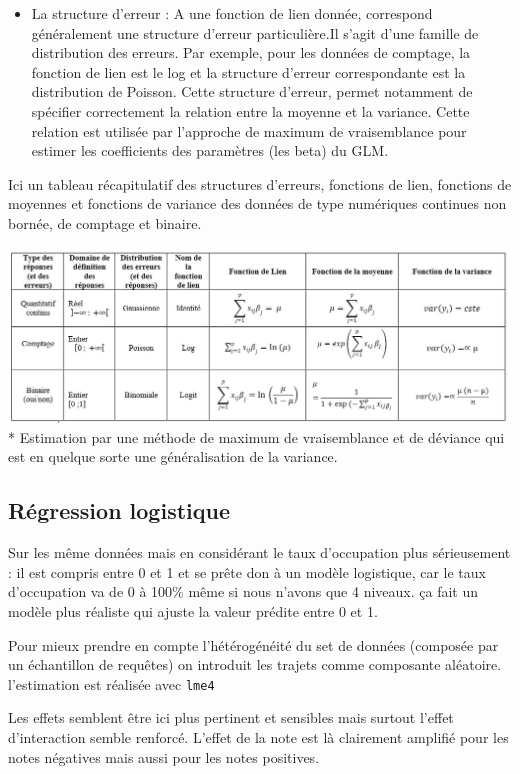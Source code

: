 \documentclass[
]{book}
\providecommand{\tightlist}{%
  \setlength{\itemsep}{0pt}\setlength{\parskip}{0pt}}
\begin{document}
\begin{itemize}
\tightlist
\item
  La structure d'erreur : A une fonction de lien donnée, correspond généralement une structure d'erreur particulière.Il s'agit d'une famille de distribution des erreurs. Par exemple, pour les données de comptage, la fonction de lien est le log et la structure d'erreur correspondante est la distribution de Poisson. Cette structure d'erreur, permet notamment de spécifier correctement la relation entre la moyenne et la variance. Cette relation est utilisée par l'approche de maximum de vraisemblance pour estimer les coefficients des paramètres (les beta) du GLM.
\end{itemize}

Ici un tableau récapitulatif des structures d'erreurs, fonctions de lien, fonctions de moyennes et fonctions de variance des données de type numériques continues non bornée, de comptage et binaire.

\includegraphics{./images/GLM.jpg}
* Estimation par une méthode de maximum de vraisemblance et de déviance qui est en quelque sorte une généralisation de la variance.

\hypertarget{ruxe9gression-logistique}{%
\subsection{Régression logistique}\label{ruxe9gression-logistique}}

Sur les même données mais en considérant le taux d'occupation plus sérieusement : il est compris entre 0 et 1 et se prête don à un modèle logistique, car le taux d'occupation va de 0 à 100\% même si nous n'avons que 4 niveaux. ça fait un modèle plus réaliste qui ajuste la valeur prédite entre 0 et 1.

Pour mieux prendre en compte l'hétérogénéité du set de données (composée par un échantillon de requêtes) on introduit les trajets comme composante aléatoire. l'estimation est réalisée avec \texttt{lme4}

Les effets semblent être ici plus pertinent et sensibles mais surtout l'effet d'interaction semble renforcé. L'effet de la note est là clairement amplifié pour les notes négatives mais aussi pour les notes positives.
\end{document}

